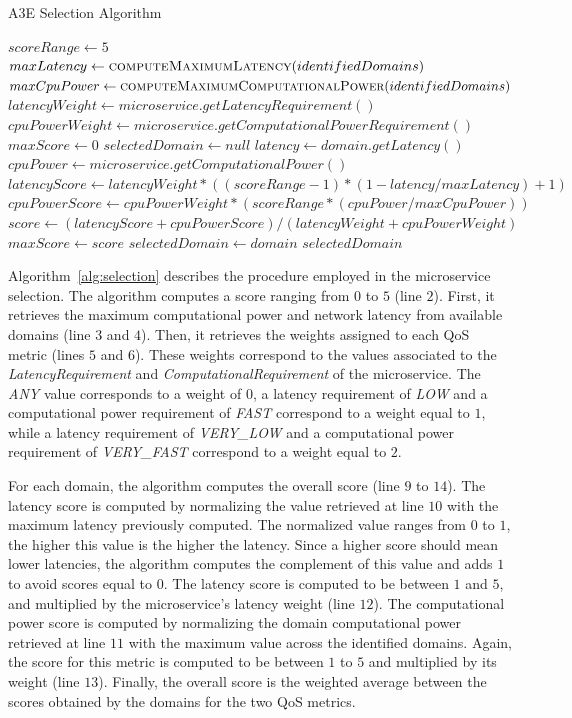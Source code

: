 \begin{algorithm}[thb]
	\caption{A3E Selection Algorithm}
	\label{alg:selection}
	\begin{algorithmic}[1]
		
		\State$scoreRange \gets 5$
		\State $maxLatency \gets \Call{computeMaximumLatency}{identifiedDomains}$
		\State $maxCpuPower \gets \Call{computeMaximumComputationalPower}{identifiedDomains}$
		\State $latencyWeight \gets microservice.getLatencyRequirement()$ 
		\State $cpuPowerWeight \gets microservice.getComputationalPowerRequirement()$ 
		\State $maxScore \gets 0$
		\State $selectedDomain \gets null$
		\State $latency \gets domain.getLatency()$ 
		\State $cpuPower \gets microservice.getComputationalPower()$ 
		\State $latencyScore \gets latencyWeight*((scoreRange-1)*(1 - latency/maxLatency)+1)$ 
		\State $cpuPowerScore \gets cpuPowerWeight*(scoreRange*(cpuPower/maxCpuPower))$
		\State $score \gets (latencyScore + cpuPowerScore) / (latencyWeight + cpuPowerWeight)$
		\State $maxScore \gets score$
		\State $selectedDomain \gets domain$
		\EndIf
		\EndFor 
		\State \Return $selectedDomain$
		\EndFunction
	\end{algorithmic}
\end{algorithm}

Algorithm~\ref{alg:selection} describes the procedure employed in the microservice selection. The algorithm computes a score ranging from $0$ to $5$ (line $2$). First, it retrieves the maximum computational power and network latency from available domains (line $3$ and $4$). Then, it retrieves the weights assigned to each QoS metric (lines $5$ and $6$). These weights correspond to the values associated to the \textit{LatencyRequirement} and \textit{ComputationalRequirement} of the microservice. The \textit{ANY} value corresponds to a weight of $0$, a latency requirement of \textit{LOW} and a computational power requirement of \textit{FAST} correspond to a weight equal to $1$, while a latency requirement of \textit{VERY\_LOW} and a computational power requirement of \textit{VERY\_FAST} correspond to a weight equal to $2$. 

For each domain, the algorithm computes the overall score (line $9$ to $14$). The latency score is computed by normalizing the value retrieved at line $10$ with the maximum latency previously computed. The normalized value ranges from $0$ to $1$, the higher this value is the higher the latency. Since a higher score should mean lower latencies, the algorithm computes the complement of this value and adds $1$ to avoid scores equal to $0$. The latency score is computed to be between $1$ and $5$, and multiplied by the microservice's latency weight (line $12$). The computational power score is computed by normalizing the domain computational power retrieved at line $11$ with the maximum value across the identified domains. Again, the score for this metric is computed to be between $1$ to $5$ and multiplied by its weight (line $13$). Finally, the overall score is the weighted average between the scores obtained by the domains for the two QoS metrics.

